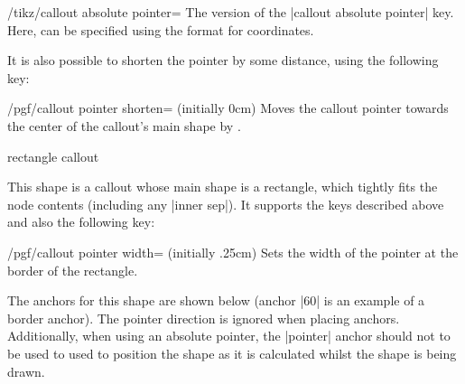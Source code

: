 \begin{key}{/tikz/callout absolute pointer=}
	The \tikzname{} version of the |callout absolute pointer| key. Here,
	 can be specified using the \tikzname{} format for
	coordinates.
\end{key}

	It is also possible to shorten the pointer by some distance, using
	the following key:
	
\begin{key}{/pgf/callout pointer shorten= (initially 0cm)}
	Moves the callout pointer towards the center of the callout's main
	shape by .
	
\begin{codeexample}[]
\end{codeexample}
\end{key}
	

\begin{shape}{rectangle callout}%
	
  This shape is a callout whose main shape is a rectangle, which
  tightly fits the node contents (including any |inner sep|).
  It  supports the keys described above and also the following
  key:


\begin{key}{/pgf/callout pointer width= (initially .25cm)}
  Sets the width of the pointer at the border of the rectangle.
\end{key}
		
	The anchors for this shape are shown below (anchor |60| is an
	example of a border anchor). The pointer direction is ignored when
	placing anchors.
	Additionally, when using an absolute pointer, the |pointer|
	anchor should not to be used to used to position the shape as it is
	calculated whilst the shape is being drawn.
	
\begin{codeexample}[]
\Huge
{}
\end{codeexample}

\end{shape}%


